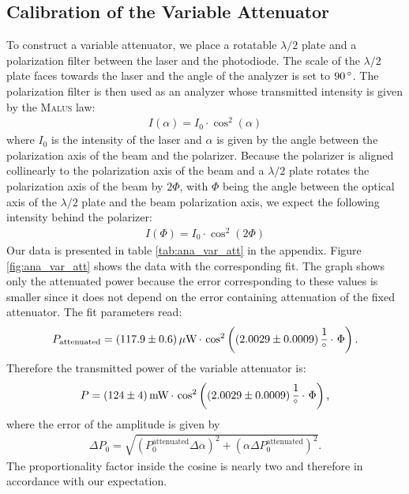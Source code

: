 \documentclass{protokoll_en}
\begin{document}
\subsection{Calibration of the Variable Attenuator}
\label{subsec:var_att_calib}
To construct a variable attenuator, we place a rotatable $\lambda /2$ plate and a polarization filter between the laser and the photodiode. The scale of the $\lambda /2$ plate faces towards the laser and the angle of the analyzer is set to $\unit[90]{^\circ}$. The polarization filter is then used as an analyzer whose transmitted intensity is given by the \textsc{Malus} law:
\begin{align*}
I(\alpha)=I_0\cdot\cos^2(\alpha)
\end{align*}
where $I_0$ is the intensity of the laser and $\alpha$ is given by the angle between the polarization axis of the beam and the polarizer. Because the polarizer is aligned collinearly to the polarization axis of the beam and a $\lambda /2$ plate rotates the polarization axis of the beam by $2\Phi$, with $\Phi$ being the angle between the optical axis of the $\lambda /2$ plate and the beam polarization axis, we expect the following intensity behind the polarizer:
\begin{align*}
I(\Phi)=I_0\cdot\cos^2(2\Phi)
\end{align*}
Our data is presented in table \ref{tab:ana_var_att} in the appendix. Figure \ref{fig:ana_var_att} shows the data with the corresponding fit. The graph shows only the attenuated power because the error corresponding to these values is smaller since it does not depend on the error containing attenuation of the fixed attenuator. The fit parameters read:
\begin{align*}
P_\textrm{attenuated} = \unit[(117.9 \pm 0.6)]{\mu W}\,\cdotp\,\cos^2\left(\unit[(2.0029 \pm 0.0009)]{\frac{1}{^\circ}} \,\cdotp\, \Phi\right)\textrm{.}
\end{align*}
Therefore the transmitted power of the variable attenuator is:
\begin{align}
P = \unit[(124 \pm 4)]{mW}\,\cdotp\,\cos^2\left(\unit[(2.0029 \pm 0.0009)]{\frac{1}{^\circ}} \,\cdotp\, \Phi\right)\textrm{,}
\end{align}
where the error of the amplitude is given by
\begin{align}
\Delta P_0 = \sqrt{\left(P_0^\textrm{attenuated}\Delta \alpha\right)^2+\left(\alpha\Delta P_0^\textrm{attenuated}\right)^2}\textrm{.}
\end{align}
The proportionality factor inside the cosine is nearly two and therefore in accordance with our expectation.
\end{document}
